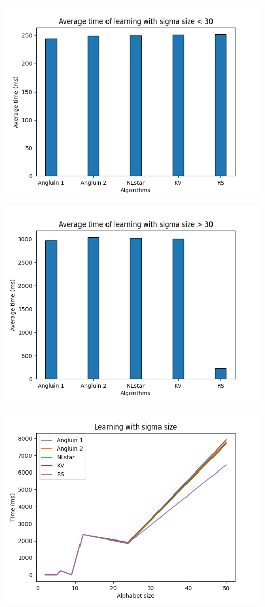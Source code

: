 \includegraphics[scale=0.75]{figures/average_time2.png}

\includegraphics[scale=0.75]{figures/average_time3.png}



\includegraphics[scale=0.75]{figures/sigma_size.png}


